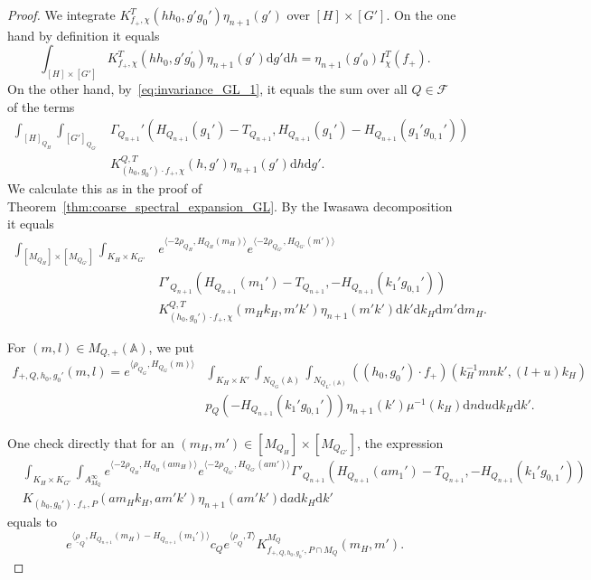 \documentclass[10pt,a4paper]{amsart}
\newcommand{\bA}{\mathbb{A}}
\newcommand{\cF}{\mathcal{F}}
\newcommand{\rd}{\mathrm{d}}
\begin{document}
\begin{proof}
We integrate $K_{f_+,\chi}^T(h h_0, g' g_0') \eta_{n+1}(g')$ over $[H] \times [G']$.
On the one hand by definition it equals
    \[
    \int_{[H] \times [G']}
    K_{f_+,\chi}^T(hh_0,g'g_0^{\prime}) \eta_{n+1}(g') \rd g' \rd h
    =  \eta_{n+1}(g'_0)  I^T_\chi(f_+).
    \]
On the other hand, by~\eqref{eq:invariance_GL_1},
it equals the sum over all $Q \in \cF$ of the terms
    \begin{equation}    \label{eq:invariant_Q_GL}
    \begin{aligned}
    \int_{[H]_{Q_H}} \int_{[G']_{Q_{G'}}}
    &\Gamma_{Q_{n+1}}'(H_{Q_{n+1}}(g_1')-T_{Q_{n+1}},H_{Q_{n+1}}(g_1')
    -H_{Q_{n+1}}(g_1' g_{0,1}'))\\
    & K_{(h_0, g_0') \cdot f_+, \chi}^{Q, T}(h, g')
    \eta_{n+1}(g') \rd h \rd g'.
    \end{aligned}
    \end{equation}
We calculate this as in the proof of
Theorem~\ref{thm:coarse_spectral_expansion_GL}. By the Iwasawa decomposition
it equals
    \begin{equation} \label{eq:invariant_Iwasawa}
            \begin{aligned}
    \int_{[M_{Q_H}] \times [M_{Q_{G'}}]} \int_{K_H \times K_{G'}}
    &e^{\langle -2\rho_{Q_H}, H_{Q_H}(m_H) \rangle}
    e^{\langle -2\rho_{Q_{G'}}, H_{Q_{G'}}(m') \rangle} \\
    &\Gamma'_{Q_{n+1}}(H_{Q_{n+1}}(m_1')-T_{Q_{n+1}},
    -H_{Q_{n+1}}(k_1' g_{0,1}'))\\
    & K_{(h_0, g_0') \cdot f_+,\chi}^{Q,T}(m_H k_H, m'k')
    \eta_{n+1}(m'k') \rd k' \rd k_H \rd m' \rd m_H .
    \end{aligned}
    \end{equation}


For $(m, l) \in M_{Q, +}(\bA)$, we put
    \begin{align*}
    f_{+, Q, h_0, g_0'}(m, l) =
    e^{\langle \rho_{Q_G},H_{Q_G}(m) \rangle}
    &\int_{K_H \times K'} \int_{{N_{Q_G}}(\bA)} \int_{N_{Q_{L^\vee}(\bA)}}
    ((h_0, g_0') \cdot f_+)(k_H^{-1}m n k',(l+ u)k_H)\\
    & p_Q(-H_{Q_{n+1}}(k_1' g_{0,1}')) \eta_{n+1}(k') \mu^{-1}(k_H)
    \rd n \rd  u \rd k_H \rd k'.
    \end{align*}

One check directly that for an $(m_H,m') \in [M_{Q_H}] \times [M_{Q_{G'}}]$, the expression
    \begin{align*}
       & \int_{K_H \times K_{G'}} \int_{A_{M_Q}^\infty}
    e^{\langle -2\rho_{Q_H}, H_{Q_H}(am_H) \rangle}
    e^{\langle -2\rho_{Q_{G'}}, H_{Q_{G'}}(am') \rangle}
    \Gamma'_{Q_{n+1}}(H_{Q_{n+1}}(am_1')-T_{Q_{n+1}},
    -H_{Q_{n+1}}(k_1' g_{0,1}'))\\
    & K_{(h_0, g_0') \cdot f_+,P}(am_H k_H, am'k')
    \eta_{n+1}(am'k')  \rd a \rd k_H \rd k'
    \end{align*}
    equals to
    \[
    e^{\langle \underline{\rho}_Q, H_{Q_{n+1}}(m_H) - H_{Q_{n+1}}(m_1') \rangle} c_Q e^{ \langle \underline{\rho}_Q, T \rangle} K_{f_{+,Q,h_0,g_0'},P \cap M_Q}^{M_Q}(m_H,m').
    \]


\end{proof}
\end{document}
